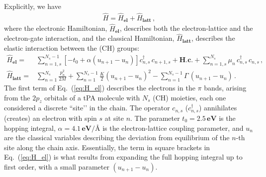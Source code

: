 \documentclass[10pt,a4paper]{article}
\begin{document}
Explicitly, we have
%
\begin{align}
\hat{H} = \hat{H}_{\textbf{el}} + \hat{H}_{\textbf{latt}} \, ,
\end{align}
%
where the electronic Hamiltonian, $\hat{H}_{\textbf{el}}$, describes both the electron-lattice and the electron-gate interaction, and the classical Hamiltonian, $\hat{H}_{\textbf{latt}}$, describes the elastic interaction between the (CH) groups:
%
\begin{align}
\hat{H}_{\textbf{el}} = & \sum_{n=1,s}^{N_{s}-1} \left[ -t_{0} + \alpha \left( u_{n+1} - u_{n} \right) \right] c_{n,s}^{\dagger} \, c_{n+1,s} + \textbf{H.c.} + \sum_{n=1,s}^{N_{s}} \mu_n \, c_{n,s}^{\dagger} \, c_{n,s} \, , \label{eq:H_el} \\
\hat{H}_{\textbf{latt}} = & \sum_{n=1}^{N_{s}} \frac{p_{n}^{2}}{2M} + \sum_{n=1}^{N_{s}-1} \frac{K}{2} \left( u_{n+1} - u_{n} \right)^{2} - \sum_{n=1}^{N_{s}-1} \Gamma \, (u_{n+1} - u_{n}) \, . \label{eq:H_latt}
\end{align}
%
The first term of Eq.~(\ref{eq:H_el}) describes the electrons in the $\pi$ bands, arising from the $2p_{z}$ orbitals of a tPA molecule with $N_{s}$ (CH) moieties, each one considered a discrete ``site’’ in the chain. The operator $c_{n,s}$ ($c^{\dagger}_{n,s}$) annihilates (creates) an electron with spin $s$ at site $n$. The parameter ${t_{0} = 2.5 \, \textbf{eV}}$ is the hopping integral, ${\alpha = 4.1 \, \textbf{eV}/\textbf{\AA}}$ is the electron-lattice coupling parameter, and $u_{n}$ are the classical variables describing the deviation from equilibrium of the $n$-th site along the chain axis. Essentially, the term in square brackets in Eq.~(\ref{eq:H_el}) is what results from expanding the full hopping integral up to first order, with a small parameter $(u_{n+1} - u_{n} )$.
\end{document}
